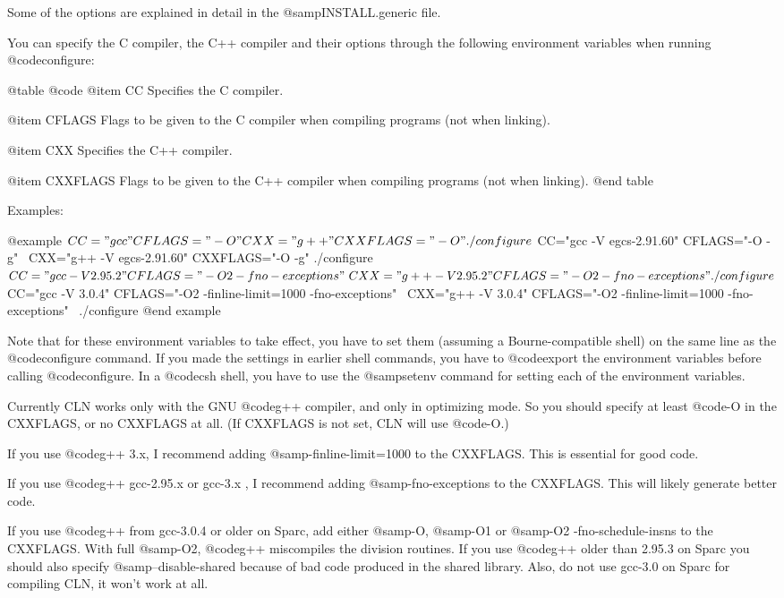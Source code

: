 Some of the options are explained in detail in the @samp{INSTALL.generic} file.

You can specify the C compiler, the C++ compiler and their options through
the following environment variables when running @code{configure}:

@table @code
@item CC
Specifies the C compiler.

@item CFLAGS
Flags to be given to the C compiler when compiling programs (not when linking).

@item CXX
Specifies the C++ compiler.

@item CXXFLAGS
Flags to be given to the C++ compiler when compiling programs (not when linking).
@end table

Examples:

@example
$ CC="gcc" CFLAGS="-O" CXX="g++" CXXFLAGS="-O" ./configure
$ CC="gcc -V egcs-2.91.60" CFLAGS="-O -g" \
  CXX="g++ -V egcs-2.91.60" CXXFLAGS="-O -g" ./configure
$ CC="gcc -V 2.95.2" CFLAGS="-O2 -fno-exceptions" \
  CXX="g++ -V 2.95.2" CFLAGS="-O2 -fno-exceptions" ./configure
$ CC="gcc -V 3.0.4" CFLAGS="-O2 -finline-limit=1000 -fno-exceptions" \
  CXX="g++ -V 3.0.4" CFLAGS="-O2 -finline-limit=1000 -fno-exceptions" \
  ./configure
@end example

Note that for these environment variables to take effect, you have to set
them (assuming a Bourne-compatible shell) on the same line as the
@code{configure} command. If you made the settings in earlier shell
commands, you have to @code{export} the environment variables before
calling @code{configure}. In a @code{csh} shell, you have to use the
@samp{setenv} command for setting each of the environment variables.

Currently CLN works only with the GNU @code{g++} compiler, and only in
optimizing mode. So you should specify at least @code{-O} in the CXXFLAGS,
or no CXXFLAGS at all. (If CXXFLAGS is not set, CLN will use @code{-O}.)

If you use @code{g++} 3.x, I recommend adding @samp{-finline-limit=1000}
to the CXXFLAGS. This is essential for good code.

If you use @code{g++} gcc-2.95.x or gcc-3.x , I recommend adding
@samp{-fno-exceptions} to the CXXFLAGS. This will likely generate better code.

If you use @code{g++} from gcc-3.0.4 or older on Sparc, add either
@samp{-O}, @samp{-O1} or @samp{-O2 -fno-schedule-insns} to the
CXXFLAGS. With full @samp{-O2}, @code{g++} miscompiles the division
routines. If you use @code{g++} older than 2.95.3 on Sparc you should
also specify @samp{--disable-shared} because of bad code produced in the
shared library. Also, do not use gcc-3.0 on Sparc for compiling CLN, it
won't work at all.


